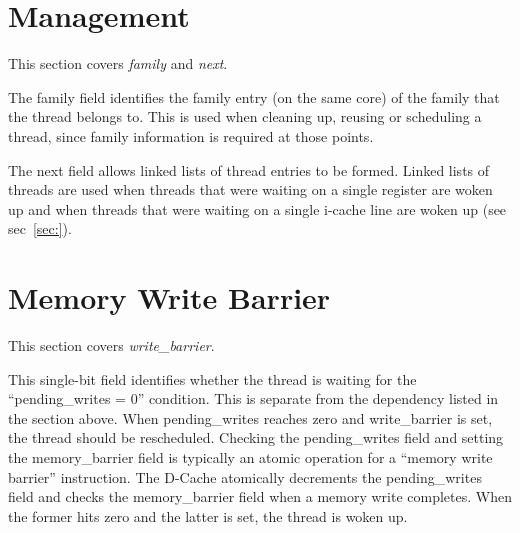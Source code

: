 \section{Management}
This section covers \emph{family} and \emph{next}.

The family field identifies the family entry (on the same core) of the family that the thread belongs to. This is used when cleaning up, reusing or scheduling a thread, since family information is required at those points.

The next field allows linked lists of thread entries to be formed. Linked lists of threads are used when threads that were waiting on a single register are woken up and when threads that were waiting on a single i-cache line are woken up (see sec~\ref{sec:}).

\section{Memory Write Barrier}
This section covers \emph{write\_barrier}.

This single-bit field identifies whether the thread is waiting for the ``pending\_writes = 0'' condition. This is separate from the dependency listed in the section above. When pending\_writes reaches zero and write\_barrier is set, the thread should be rescheduled. Checking the pending\_writes field and setting the memory\_barrier field is typically an atomic operation for a ``memory write barrier'' instruction. The D-Cache atomically decrements the pending\_writes field and checks the memory\_barrier field when a memory write completes. When the former hits zero and the latter is set, the thread is woken up.